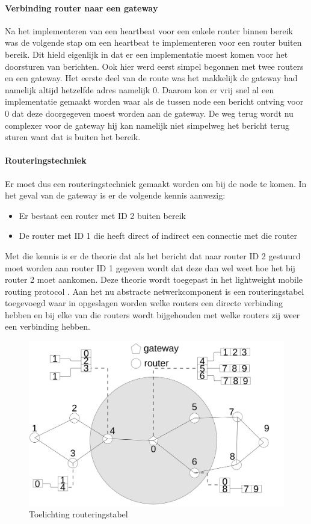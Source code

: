 \documentclass[a4paper, 11pt, oneside]{report}
\begin{document}
\paragraph{Verbinding router naar een gateway}
Na het implementeren van een heartbeat voor een enkele router binnen bereik was de volgende stap om een heartbeat te implementeren voor een router buiten bereik. Dit hield eigenlijk in dat er een implementatie moest komen voor het doorsturen van berichten. Ook hier werd eerst simpel begonnen met twee routers en een gateway. Het eerste deel van de route was het makkelijk de gateway had namelijk altijd hetzelfde adres namelijk 0. Daarom kon er vrij snel al een implementatie gemaakt worden waar als de tussen node een bericht ontving voor 0 dat deze doorgegeven moest worden aan de gateway. De weg terug wordt nu complexer voor de gateway hij kan namelijk niet simpelweg het bericht terug sturen want dat is buiten het bereik.
\paragraph{Routeringstechniek}
Er moet dus een routeringstechniek gemaakt worden om bij de node te komen.
In het geval van de gateway is er de volgende kennis aanwezig:
\begin{itemize}
	\item Er bestaat een router met ID 2 buiten bereik
	\item De router met ID 1 die heeft direct of indirect een connectie met die router
\end{itemize}

Met die kennis is er de theorie dat als het bericht dat naar router ID 2 gestuurd moet worden aan router ID 1 gegeven wordt dat deze dan wel weet hoe het bij router 2 moet aankomen.
Deze theorie wordt toegepast in het lightweight mobile routing protocol \cite{LMR}.
Aan het nu abstracte netwerkcomponent is een routeringstabel toegevoegd waar in opgeslagen worden welke routers een directe verbinding hebben en bij elke van die routers wordt bijgehouden met welke routers zij weer een verbinding hebben.

\begin{figure}[H]
	\begin{center}\includegraphics[width=0.6\linewidth]{Afbeeldingen/uitlegtabel.png}\end{center}
	\caption{Toelichting routeringstabel}
	\label{fig:routeringstabel}
\end{figure}
\end{document}
